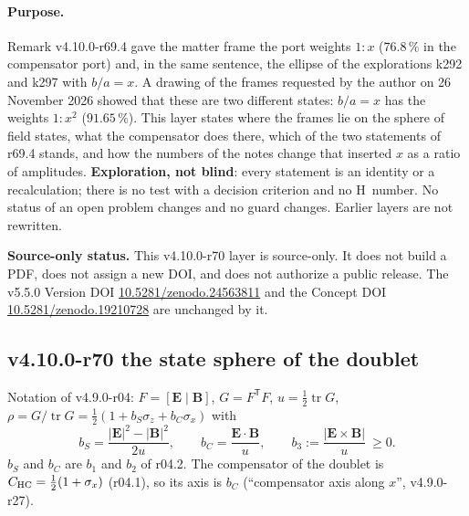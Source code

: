 \paragraph{Purpose.}
Remark v4.10.0-r69.4 gave the matter frame the port weights \(1:x\) (\(76.8\,\%\) in the compensator port) and, in the same sentence, the
ellipse of the explorations k292 and k297 with \(b/a=x\).  A drawing of the frames requested by the author on 26 November 2026 showed that
these are two different states: \(b/a=x\) has the weights \(1:x^2\) (\(91.65\,\%\)).  This layer states where the frames lie on the sphere of
field states, what the compensator does there, which of the two statements of r69.4 stands, and how the numbers of the notes change that
inserted \(x\) as a ratio of amplitudes.  \textbf{Exploration, not blind}: every statement is an identity or a recalculation; there is no test
with a decision criterion and no H~number.  No status of an open problem changes and no guard changes.  Earlier layers are not rewritten.

\noindent\textbf{Source-only status.}
This v4.10.0-r70 layer is source-only.  It does not build a PDF, does not assign a new DOI,
and does not authorize a public release.  The v5.5.0 Version DOI
\href{https://doi.org/10.5281/zenodo.24563811}{10.5281/zenodo.24563811} and the Concept DOI
\href{https://doi.org/10.5281/zenodo.19210728}{10.5281/zenodo.19210728} are unchanged by it.

\subsection*{v4.10.0-r70 the state sphere of the doublet}
\label{subsec:v4100-r70-sphere}

Notation of v4.9.0-r04: \(F=[\mathbf E\mid\mathbf B]\), \(G=F^{\mathsf T}F\), \(u=\tfrac12\operatorname{tr}G\),
\(\rho=G/\operatorname{tr}G=\tfrac12(1+b_S\sigma_z+b_C\sigma_x)\) with
\[
b_S=\frac{|\mathbf E|^2-|\mathbf B|^2}{2u},\qquad b_C=\frac{\mathbf E\cdot\mathbf B}{u},\qquad b_3:=\frac{|\mathbf E\times\mathbf B|}{u}\ \ge0 .
\]
\(b_S\) and \(b_C\) are \(b_1\) and \(b_2\) of r04.2.  The compensator of the doublet is \(C_{\mathrm{HC}}=\tfrac12(1+\sigma_x)\) (r04.1), so its axis is
\(b_C\) (``compensator axis along \(x\)'', v4.9.0-r27).

